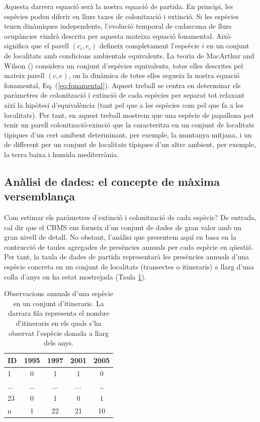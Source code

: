 \documentclass{article}
\begin{document}
Aquesta darrera equaci\'o ser\`a la nostra equaci\'o de partida. En principi, les esp\`ecies poden diferir en llurs taxes de colonitzaci\'o i extinci\'o. Si les esp\`ecies tenen din\`amiques independents, l'evoluci\'o temporal de cadascuna de llurs ocup\`ancies vindr\`a descrita per aquesta mateixa equaci\'o fonamental. Aix\`o significa que el parell $(c_{i},e_{i})$ defineix completament l'espe\`ecie $i$ en un conjunt de localitats amb condicions ambientals equivalents. La teoria de MacArthur and Wilson (\citeyear{MacArthurWilson67}) considera un conjunt d'esp\`ecies equivalents, totes elles descrites pel mateix parell $(c, e)$, on la din\`amica de totes elles segueix la nostra equaci\'o fonamental, Eq. (\ref{eq:fonamental}). Aquest treball se centra en determinar els par\`ametres de colonitzaci\'o i extinci\'o de cada esp\`ecies per separat tot relaxant aix\'i la hip\`otesi d'equival\`encia (tant pel que a les esp\`ecies com pel que fa a les localitats). Per tant, en aquest treball mostrem que una esp\`ecie de papallona pot tenir un parell colonitzaci\'o-exinci\'o que la caracteritza en un conjunt de localitats tipiques d'un cert amibent determinant, per exemple, la muntanya mitjana, i un de different per un conjunt de localitats t\'ipiques d'un altre ambient, per exemple, la terra baixa i humida mediterr\`ania.  
\smallskip

\subsection{An\`alisi de dades: el concepte de m\`axima versemblan\c{c}a} 
Com estimar els par\`ametres d'extinci\'o i colonitzaci\'o de cada esp\`ecie? De entrada, cal dir que el CBMS ens forneix d'un conjunt de dades de gran valor amb un gran nivell de detall. No obstant, l'an\`alisi que presentem aqu\'i en basa en la contrucci\'o de taules agregades de pres\`encies annuals per cada esp\`ecie en q\"uesti\'o. Per tant, la taula de dades de partida representar\`a les pres\`encies annuals d'una esp\`ecie concreta en un conjunt de localitats (transectes o itineraris) a llarg d'una colla d'anys on ha estat mostrejada (Taula \ref{tab:observacions}).   

\begin{table}
    \centering
    \begin{tabular}{l|c|c|c|c}
         ID      & 1995 & 1997 & 2001 & 2005 \\
         \hline
         1       &  0   &   1  &   1  & 0  \\
         $\dots$ & $\dots$ & $\dots$  & $\dots$ & \dots \\  
         23      &  0   &   1  &   0  & 1      \\
         \hline
         n       &  1   &   22 &   21 &  10     
    \end{tabular}
    \caption{Observacions annuals d'una esp\`ecie en un conjunt d'itineraris. La darrara fila representa el nombre d'itineraris en els quals s'ha observat l'esp\`ecie donada a llarg dels anys.}
    \label{tab:observacions}
\end{table}
\end{document}
